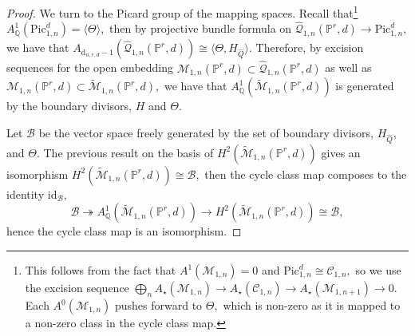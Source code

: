 \documentclass[12pt,reqno]{amsart}
\theoremstyle{definition}
\theoremstyle{definition}
\theoremstyle{definition}
\theoremstyle{definition}
\newcommand{\Mtil}{\widetilde{\mathcal{M}}}
\begin{document}
\begin{proof}
  We turn to the Picard group of the mapping spaces. Recall that\footnote{This follows from the fact that $A^1(\mathcal{M}_{1,n}) = 0$ and $\mathrm{Pic}^d_{1,n}\cong \mathcal{C}_{1,n},$ so we use the excision sequence $\bigoplus_{n}A_\star(\mathcal{M}_{1,n})\to A_\star(\mathcal{C}_{1,n})\to A_\star(\mathcal{M}_{1,n+1})\to 0.$ Each $A^0(\mathcal{M}_{1,n})$ pushes forward to $\Theta,$ which is non-zero as it is mapped to a non-zero class in the cycle class map.} $A^1_{\mathbb{Q}}(\mathrm{Pic}^d_{1,n})=\langle \Theta\rangle,$ then by projective bundle formula on $\hat{\mathcal{Q}}_{1,n}(\mathbb{P}^r,d)\to \mathrm{Pic}^d_{1,n},$ we have that $A_{\mathrm{d}_{n,r,d}-1}(\hat{\mathcal{Q}}_{1,n}(\mathbb{P}^r,d))\cong \langle \Theta, H_{\hat{Q}}\rangle.$ Therefore, by excision sequences for the open embedding $\mathcal{M}_{1,n}(\mathbb{P}^r,d)\subset \hat{\mathcal{Q}}_{1,n}(\mathbb{P}^r,d)$ as well as $\mathcal{M}_{1,n}(\mathbb{P}^r,d)\subset \Mtil_{1,n}(\mathbb{P}^r,d),$ we have that $A^1_{\mathbb{Q}}(\Mtil_{1,n}(\mathbb{P}^r,d))$ is generated by the boundary divisors, $H$ and $\Theta.$

  Let $\mathcal{B}$ be the vector space freely generated by the set of boundary divisors, $H_{\hat{Q}}$, and $\Theta.$ The previous result on the basis of $H^2(\Mtil_{1,n}(\mathbb{P}^r,d))$ gives an isomorphism $H^2(\Mtil_{1,n}(\mathbb{P}^r,d))\cong \mathcal{B},$ then the cycle class map composes to the identity $\mathrm{id}_{\mathcal{B}},$ $$\mathcal{B}\twoheadrightarrow A^1_{\mathbb{Q}}(\Mtil_{1,n}(\mathbb{P}^r,d))\to H^2(\Mtil_{1,n}(\mathbb{P}^r,d))\cong \mathcal{B},$$ hence the cycle class map is an isomorphism.
\end{proof}
\end{document}
